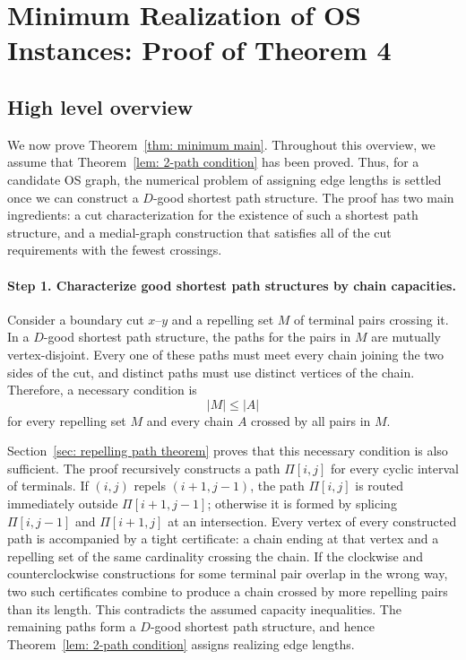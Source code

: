 \documentclass[11pt]{article}
\begin{document}
\section{Minimum Realization of OS Instances: Proof of Theorem 4}\label{sec:minimum-proof}

\subsection{High level overview}

We now prove Theorem~\ref{thm: minimum main}. Throughout this overview, we assume that Theorem~\ref{lem: 2-path condition} has been proved. Thus, for a candidate OS graph, the numerical problem of assigning edge lengths is settled once we can construct a $D$-good shortest path structure. The proof has two main ingredients: a cut characterization for the existence of such a shortest path structure, and a medial-graph construction that satisfies all of the cut requirements with the fewest crossings.

\paragraph{Step 1. Characterize good shortest path structures by chain capacities.}
Consider a boundary cut $x$--$y$ and a repelling set $M$ of terminal pairs crossing it. In a $D$-good shortest path structure, the paths for the pairs in $M$ are mutually vertex-disjoint. Every one of these paths must meet every chain joining the two sides of the cut, and distinct paths must use distinct vertices of the chain. Therefore, a necessary condition is
\[
|M|\le |A|
\]
for every repelling set $M$ and every chain $A$ crossed by all pairs in $M$.

Section~\ref{sec: repelling path theorem} proves that this necessary condition is also sufficient. The proof recursively constructs a path $\Pi[i,j]$ for every cyclic interval of terminals. If $(i,j)$ repels $(i+1,j-1)$, the path $\Pi[i,j]$ is routed immediately outside $\Pi[i+1,j-1]$; otherwise it is formed by splicing $\Pi[i,j-1]$ and $\Pi[i+1,j]$ at an intersection. Every vertex of every constructed path is accompanied by a tight certificate: a chain ending at that vertex and a repelling set of the same cardinality crossing the chain. If the clockwise and counterclockwise constructions for some terminal pair overlap in the wrong way, two such certificates combine to produce a chain crossed by more repelling pairs than its length. This contradicts the assumed capacity inequalities. The remaining paths form a $D$-good shortest path structure, and hence Theorem~\ref{lem: 2-path condition} assigns realizing edge lengths.
\end{document}
